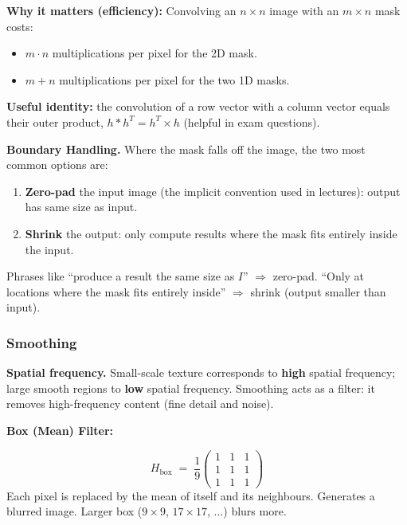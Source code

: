 \textbf{Why it matters (efficiency):} Convolving an $n \times n$ image with an $m \times n$ mask costs:
\begin{itemize}
  \item $m \cdot n$ multiplications per pixel for the 2D mask.
  \item $m + n$ multiplications per pixel for the two 1D masks.
\end{itemize}
\textbf{Useful identity:} the convolution of a row vector with a column vector equals their outer product, $h \ast h^T = h^T \times h$ (helpful in exam questions).

\separator

\textbf{Boundary Handling.} Where the mask falls off the image, the two most common options are:
\begin{enumerate}
  \item \textbf{Zero-pad} the input image (the implicit convention used in lectures): output has same size as input.
  \item \textbf{Shrink} the output: only compute results where the mask fits entirely inside the input.
\end{enumerate}

\begin{tipbox}
Phrases like ``produce a result the same size as $I$'' $\Rightarrow$ zero-pad. ``Only at locations where the mask fits entirely inside'' $\Rightarrow$ shrink (output smaller than input).
\end{tipbox}

\bigseparator

\subsubsection{Smoothing}

\textbf{Spatial frequency.} Small-scale texture corresponds to \textbf{high} spatial frequency; large smooth regions to \textbf{low} spatial frequency. Smoothing acts as a  filter: it removes high-frequency content (fine detail and noise).

\separator

\textbf{Box (Mean) Filter:}

\[
H_{\text{box}} \;=\; \frac{1}{9}\begin{pmatrix} 1 & 1 & 1 \\ 1 & 1 & 1 \\ 1 & 1 & 1 \end{pmatrix}
\]
Each pixel is replaced by the mean of itself and its neighbours. Generates a blurred image. Larger box ($9\times 9$, $17 \times 17$, $\dots$) blurs more.

